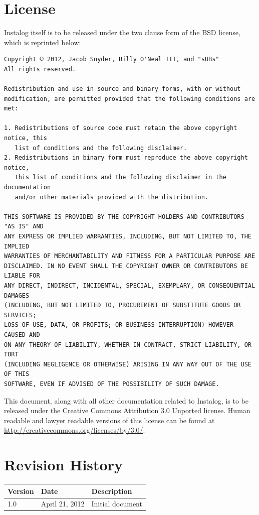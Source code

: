 \documentclass[letterpaper,12pt]{article}
\begin{document}
\newpage



\appendix
\section{License} \label{license}
Instalog itself is to be released under the two clause form of the BSD license,
which is reprinted below:

\begin{verbatim}
Copyright © 2012, Jacob Snyder, Billy O'Neal III, and "sUBs"
All rights reserved.

Redistribution and use in source and binary forms, with or without
modification, are permitted provided that the following conditions are met: 

1. Redistributions of source code must retain the above copyright notice, this
   list of conditions and the following disclaimer. 
2. Redistributions in binary form must reproduce the above copyright notice,
   this list of conditions and the following disclaimer in the documentation
   and/or other materials provided with the distribution. 

THIS SOFTWARE IS PROVIDED BY THE COPYRIGHT HOLDERS AND CONTRIBUTORS "AS IS" AND
ANY EXPRESS OR IMPLIED WARRANTIES, INCLUDING, BUT NOT LIMITED TO, THE IMPLIED
WARRANTIES OF MERCHANTABILITY AND FITNESS FOR A PARTICULAR PURPOSE ARE
DISCLAIMED. IN NO EVENT SHALL THE COPYRIGHT OWNER OR CONTRIBUTORS BE LIABLE FOR
ANY DIRECT, INDIRECT, INCIDENTAL, SPECIAL, EXEMPLARY, OR CONSEQUENTIAL DAMAGES
(INCLUDING, BUT NOT LIMITED TO, PROCUREMENT OF SUBSTITUTE GOODS OR SERVICES;
LOSS OF USE, DATA, OR PROFITS; OR BUSINESS INTERRUPTION) HOWEVER CAUSED AND
ON ANY THEORY OF LIABILITY, WHETHER IN CONTRACT, STRICT LIABILITY, OR TORT
(INCLUDING NEGLIGENCE OR OTHERWISE) ARISING IN ANY WAY OUT OF THE USE OF THIS
SOFTWARE, EVEN IF ADVISED OF THE POSSIBILITY OF SUCH DAMAGE.
\end{verbatim}

This document, along with all other documentation related to Instalog,  is to be
released under the Creative Commons Attribution 3.0 Unported license. Human
readable and lawyer readable versions of this license can be found at
\url{http://creativecommons.org/licenses/by/3.0/}.

\newpage

\section{Revision History} \label{revision_history}
\begin{tabular}{| l | l | l |}
\hline
\textbf{Version} & \textbf{Date} & \textbf{Description} \\
\hline
1.0 & April 21, 2012 & Initial document \\
\hline
\end{tabular}
\end{document}
